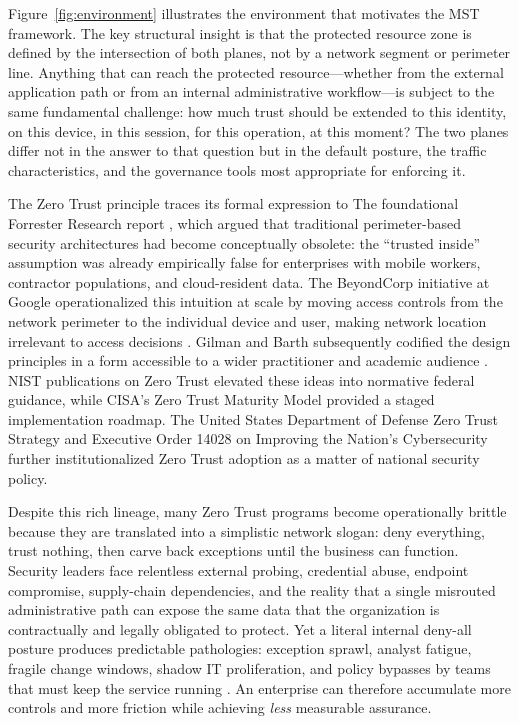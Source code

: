 \documentclass[unnumsec,webpdf,contemporary,large]{oup-authoring-template}
\theoremstyle{thmstyleone}
\theoremstyle{thmstyletwo}
\theoremstyle{thmstylethree}
\begin{document}
Figure~\ref{fig:environment} illustrates the environment that motivates the MST
framework. The key structural insight is that the protected resource zone is defined
by the intersection of both planes, not by a network segment or perimeter line.
Anything that can reach the protected resource---whether from the external application
path or from an internal administrative workflow---is subject to the same fundamental
challenge: how much trust should be extended to this identity, on this device, in this
session, for this operation, at this moment? The two planes differ not in the answer to
that question but in the default posture, the traffic characteristics, and the
governance tools most appropriate for enforcing it.

The Zero Trust principle traces its formal expression to The foundational Forrester Research report \cite{kindervag2010}, which argued that traditional perimeter-based security
architectures had become conceptually obsolete: the ``trusted inside'' assumption was already
empirically false for enterprises with mobile workers, contractor populations, and
cloud-resident data. The BeyondCorp initiative at Google operationalized this intuition at
scale by moving access controls from the network perimeter to the individual device and user,
making network location irrelevant to access decisions \cite{ward2014beyondcorp,
osborn2016beyondcorp}. Gilman and Barth subsequently codified the design principles in a
form accessible to a wider practitioner and academic audience \cite{gilman2017}. NIST publications on Zero Trust \cite{rose2020,chandramouli2023} elevated these ideas into normative federal guidance, while CISA's
Zero Trust Maturity Model \cite{cisa2023} provided a staged implementation roadmap. The United States Department of Defense Zero Trust Strategy \cite{dod2022} and Executive Order
14028 on Improving the Nation's Cybersecurity \cite{eo14028} further institutionalized Zero
Trust adoption as a matter of national security policy.

Despite this rich lineage, many Zero Trust programs become operationally brittle because they
are translated into a simplistic network slogan: deny everything, trust nothing, then carve
back exceptions until the business can function. Security leaders face relentless external
probing, credential abuse, endpoint compromise, supply-chain dependencies, and the reality
that a single misrouted administrative path can expose the same data that the organization is
contractually and legally obligated to protect. Yet a literal internal deny-all posture
produces predictable pathologies: exception sprawl, analyst fatigue, fragile change windows,
shadow IT proliferation, and policy bypasses by teams that must keep the service running
\cite{buck2021}. An enterprise can therefore accumulate more controls and more friction while
achieving \textit{less} measurable assurance.
\end{document}
